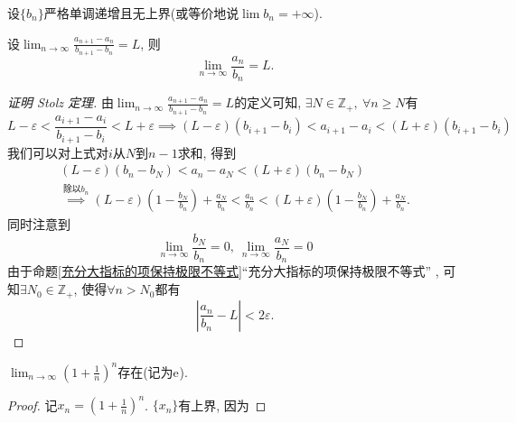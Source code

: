 \begin{theorem}
    设$\{ b_n \}$严格单调递增且无上界(或等价地说$\lim b_n = +\infty$).

    设$\displaystyle \lim_{n \to \infty} \frac{a_{n+1}-a_n}{b_{n+1}-b_n}=L$, 则
    \begin{equation}
      \lim_{n \to \infty} \frac{a_n}{b_n} = L.
    \end{equation}
\end{theorem}

\begin{proof}[证明 Stolz 定理]
    由$\displaystyle \lim_{n \to \infty} \frac{a_{n+1}-a_n}{b_{n+1}-b_n}=L$的定义可知, $\exists N \in \mathbb{Z}_{+},\ \forall n \ge N$有
    \begin{equation}
      L-\varepsilon< \frac{a_{i+1}-a_i}{b_{i+1}-b_i} < L+\varepsilon 
      \implies (L-\varepsilon)(b_{i+1}-b_{i}) < a_{i+1}-a_i < (L+\varepsilon)(b_{i+1}-b_i)
    \end{equation} 
    我们可以对上式对$i$从$N$到$n-1$求和, 得到
    \begin{gather}
      (L-\varepsilon)(b_{n}-b_{N}) < a_{n} - a_{N} < (L+\varepsilon)(b_{n}-b_{N})
      \\
      \mathop{\implies}\limits^{\text{除以}b_n}_{} 
      (L-\varepsilon)\left( 1- \frac{b_{N}}{b_n} \right) + \frac{a_{N}}{b_n} < \frac{a_n}{b_n} < (L+\varepsilon)\left( 1- \frac{b_{N}}{b_n} \right) + \frac{a_{N}}{b_n}.
    \end{gather}
    同时注意到
    \begin{equation}
      \lim_{n \to \infty} \frac{b_{N}}{b_n} = 0,\ 
      \lim_{n \to \infty} \frac{a_{N}}{b_n} = 0
    \end{equation}
    由于命题\ref{充分大指标的项保持极限不等式}``充分大指标的项保持极限不等式''
    , 可知$\exists N_0 \in \mathbb{Z}_{+}$, 使得$\forall n > N_0$都有
    \begin{equation}
      \left| \frac{a_n}{b_n}-L \right| < 2\varepsilon.
    \end{equation}
\end{proof}

% 
% 
% 
% 
% 
% 
% 
% 
% 
% 
% 
% 
% 


\begin{theorem}[Euler]
    $\displaystyle \lim_{n \to \infty}\left( 1+\frac{1}{n} \right) ^{n}$存在(记为$\mathrm{e}^{}$).
\end{theorem}

\begin{proof}
    记$x_n = \left( 1+\frac{1}{n} \right) ^{n}$.
    $\{ x_n \}$有上界, 因为

\end{proof}

